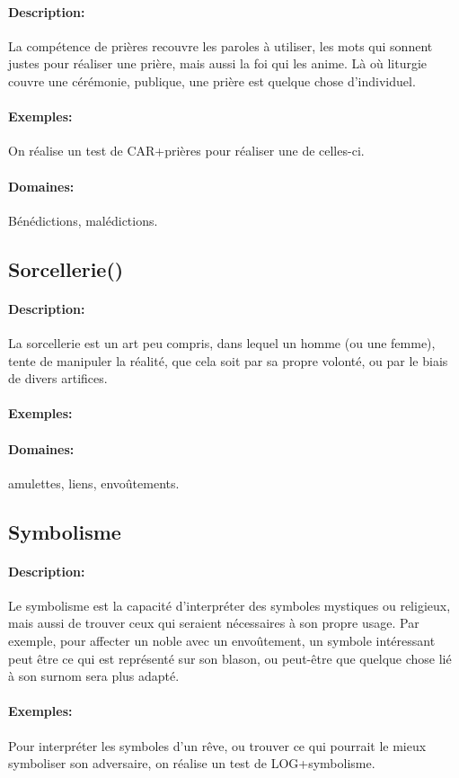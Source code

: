 \documentclass[10pt,a4paper,twocolumn]{book}
\begin{document}
\paragraph{Description:}La compétence de prières recouvre les paroles à utiliser, les mots qui sonnent justes pour réaliser une prière, mais aussi la foi qui les anime. Là où liturgie couvre une cérémonie, publique, une prière est quelque chose d'individuel.
\paragraph{Exemples:}On réalise un test de CAR+prières pour réaliser une de celles-ci.
\paragraph{Domaines:}Bénédictions, malédictions.
\subsection{Sorcellerie()}
\paragraph{Description:}La sorcellerie est un art peu compris, dans lequel un homme (ou une femme), tente de manipuler la réalité, que cela soit par sa propre volonté, ou par le biais de divers artifices.
\paragraph{Exemples:}
\paragraph{Domaines:}amulettes, liens, envoûtements.
\subsection{Symbolisme}
\paragraph{Description:}Le symbolisme est la capacité d'interpréter des symboles mystiques ou religieux, mais aussi de trouver ceux qui seraient nécessaires à son propre usage. Par exemple, pour affecter un noble avec un envoûtement, un symbole intéressant peut être ce qui est représenté sur son blason, ou peut-être que quelque chose lié à son surnom sera plus adapté.
\paragraph{Exemples:}Pour interpréter les symboles d'un rêve, ou trouver ce qui pourrait le mieux symboliser son adversaire, on réalise un test de LOG+symbolisme.
\end{document}
